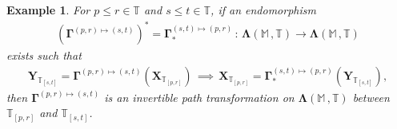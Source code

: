 \documentclass[12pt,a4paper]{article}
\newtheorem{ex}[thm]{Example}
\def\T{\mathbb{T}}
\begin{document}
\begin{ex}
\emph{For $p\leq r \in \T$ and $s\leq t \in \T$, if an endomorphism 
\begin{align}
\left(\boldsymbol{\Gamma}^{(p,r)\mapsto(s,t)}\right)^{*} = \boldsymbol{\Gamma}_{*}^{(s,t)\mapsto(p,r)} \,: \, \boldsymbol{\Lambda}(\mathbb M \,, \T) \rightarrow \boldsymbol{\Lambda}(\mathbb M \,, \T) 
\end{align}
exists such that
\begin{align}
\boldsymbol{Y}_{\T_{[s,t]}} = \boldsymbol{\Gamma}^{(p,r)\mapsto(s,t)}\left( \boldsymbol{X}_{\T_{[p,r]}}\right) \, \implies \, \boldsymbol{X}_{\T_{[p,r]}} = \boldsymbol{\Gamma}_{*}^{(s,t)\mapsto(p,r)}\left(\boldsymbol{Y}_{\T_{[s,t]}}\right), 
\end{align}
then $\boldsymbol{\Gamma}^{(p,r)\mapsto(s,t)}$ is an invertible path transformation on $\boldsymbol{\Lambda}(\mathbb M \,, \T)$ between $\T_{[p,r]}$ and $\T_{[s,t]}$.}
\end{ex}
\end{document}
